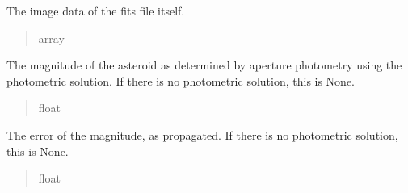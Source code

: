 \documentclass[letterpaper,11pt,english]{sphinxmanual}
\begin{document}
\begin{savenotes}
\begin{fulllineitems}

\begin{savenotes}\begin{fulllineitems}
\label{\detokenize{code/opihiexarata.opihi.solution:opihiexarata.opihi.solution.OpihiSolution.data}}
\pysigstartsignatures
{}
\pysigstopsignatures
\sphinxAtStartPar
The image data of the fits file itself.
\begin{quote}\begin{description}
\sphinxAtStartPar
array

\end{description}\end{quote}

\end{fulllineitems}\end{savenotes}


\begin{savenotes}\begin{fulllineitems}
\label{\detokenize{code/opihiexarata.opihi.solution:opihiexarata.opihi.solution.OpihiSolution.asteroid_magnitude}}
\pysigstartsignatures
{}
\pysigstopsignatures
\sphinxAtStartPar
The magnitude of the asteroid as determined by aperture photometry
using the photometric solution. If there is no photometric solution,
this is None.
\begin{quote}\begin{description}
\sphinxAtStartPar
float

\end{description}\end{quote}

\end{fulllineitems}\end{savenotes}


\begin{savenotes}\begin{fulllineitems}
\label{\detokenize{code/opihiexarata.opihi.solution:opihiexarata.opihi.solution.OpihiSolution.asteroid_magnitude_error}}
\pysigstartsignatures
{}
\pysigstopsignatures
\sphinxAtStartPar
The error of the magnitude, as propagated. If there is no photometric
solution, this is None.
\begin{quote}\begin{description}
\sphinxAtStartPar
float


\end{description}
\end{quote}
\end{fulllineitems}
\end{savenotes}
\end{fulllineitems}
\end{savenotes}
\end{document}
